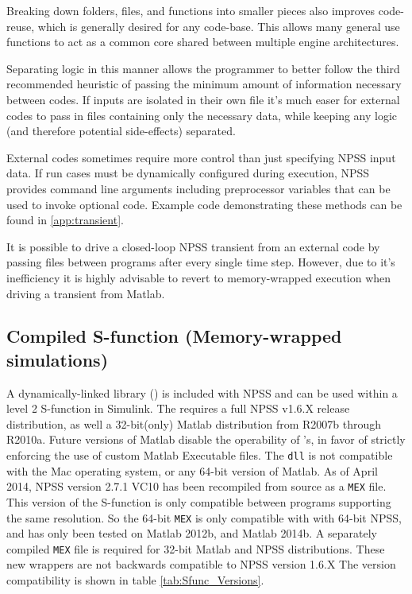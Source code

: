 \documentclass[heading.tex]{subfiles}
\begin{document}
Breaking down folders, files, and functions into smaller pieces also improves code-reuse,
which is generally desired for any code-base.
This allows many general use functions to act as a common core shared between multiple engine architectures.

Separating logic in this manner allows the programmer to better follow the third recommended heuristic
of passing the minimum amount of information necessary between codes. If inputs are isolated in their own file
it's much easer for external codes to pass in files containing only the necessary data, 
while keeping any logic (and therefore potential side-effects) separated.

External codes sometimes require more control than just specifying NPSS input data.
If run cases must be dynamically configured during execution,
NPSS provides command line arguments \cite[chap.~2.1]{NPSS}
including preprocessor variables that can be used to invoke optional code.
Example code demonstrating these methods can be found in \cref{app:transient}.

It is possible to drive a closed-loop NPSS transient from an external code
by passing files between programs after every single time step.
However, due to it's inefficiency it is highly advisable to revert to
memory-wrapped execution when driving a transient from Matlab.

\subsection{Compiled S-function (Memory-wrapped simulations)}

A dynamically-linked library () is included with NPSS
and can be used within a level 2 S-function in Simulink. 
The  requires a full NPSS v1.6.X release distribution,
as well a 32-bit(only) Matlab distribution from R2007b through R2010a.
Future versions of Matlab disable the operability of 's,
in favor of strictly enforcing the use of custom Matlab Executable  files.
The \texttt{dll} is not compatible with the Mac operating system, or any 64-bit version
of Matlab. As of April 2014, NPSS version 2.7.1 VC10
has been recompiled from source as a \texttt{MEX} file.
This version of the S-function is only compatible between programs supporting
the same resolution.
So the 64-bit \texttt{MEX} is only compatible with with 64-bit NPSS,
and has only been tested on Matlab 2012b, and Matlab 2014b.
A separately compiled \texttt{MEX} file is required for 32-bit Matlab and NPSS distributions.
These new wrappers are not backwards compatible to NPSS version 1.6.X
The version compatibility is shown in table \ref{tab:Sfunc_Versions}.
\end{document}
